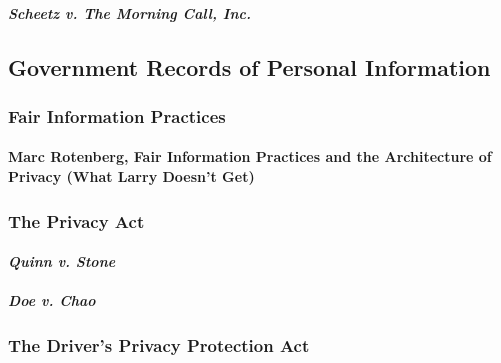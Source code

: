 
\paragraph{\emph{Scheetz v. The Morning Call, Inc.}}


\subsection{Government Records of Personal Information}

\subsubsection{Fair Information Practices}


\paragraph{Marc Rotenberg, Fair Information Practices and the Architecture of 
Privacy (What Larry Doesn't Get)}


\subsubsection{The Privacy Act}


\paragraph{\emph{Quinn v. Stone}}


\paragraph{\emph{Doe v. Chao}}


\subsubsection{The Driver's Privacy Protection Act}

